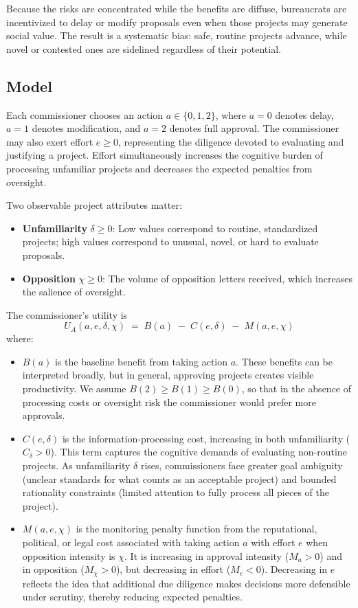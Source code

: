 Because the risks are concentrated while the benefits are diffuse, bureaucrats are incentivized to delay or modify proposals even when those projects may generate social value. The result is a systematic bias: safe, routine projects advance, while novel or contested ones are sidelined regardless of their potential.


\subsection{Model}

Each commissioner chooses an action $a \in \{0,1,2\}$, where $a=0$ denotes delay, $a=1$ denotes modification, and $a=2$ denotes full approval. The commissioner may 
also exert effort $e \geq 0$, representing the diligence devoted to evaluating and justifying a project. Effort simultaneously increases the cognitive burden of processing unfamiliar projects and decreases the expected penalties from oversight.

Two observable project attributes matter:

\begin{itemize}
    \item \textbf{Unfamiliarity} $\delta \geq 0$: Low values correspond to routine, standardized projects; high values correspond to unusual, novel, or hard to evaluate proposals.
    \item \textbf{Opposition} $\chi \geq 0$: The volume of opposition letters received, which increases the salience of oversight.
\end{itemize}

The commissioner's utility is
\begin{equation}
    U_A(a,e,\delta,\chi) \;=\; B(a) \;-\; C(e,\delta) \;-\; M(a,e,\chi)
    \label{eq:agentutility}
\end{equation}
where:
\begin{itemize}
    \item $B(a)$ is the baseline benefit from taking action $a$. These benefits can be interpreted broadly, but in general, approving projects creates visible productivity. We assume $B(2)\geq B(1)\geq B(0)$, so that in the absence of processing costs or oversight risk the commissioner would prefer more approvals.
    \item $C(e,\delta)$ is the information-processing cost, increasing in both unfamiliarity ($C_\delta >0$). This term captures the cognitive demands of evaluating non-routine projects. As unfamiliarity $\delta$ rises, commissioners face greater goal ambiguity (unclear standards for what counts as an acceptable project) and bounded rationality constraints (limited attention to fully process all pieces of the project). 
    \item $M(a,e,\chi)$ is the monitoring penalty function from the reputational, political, or legal cost associated with taking action $a$ with effort $e$ when opposition intensity is $\chi$. It is increasing in approval intensity ($M_a > 0$) and in opposition ($M_\chi > 0$), but decreasing in effort ($M_e < 0$). Decreasing in $e$ reflects the idea that additional due diligence makes decisions more defensible under scrutiny, thereby reducing expected penalties.
\end{itemize}


